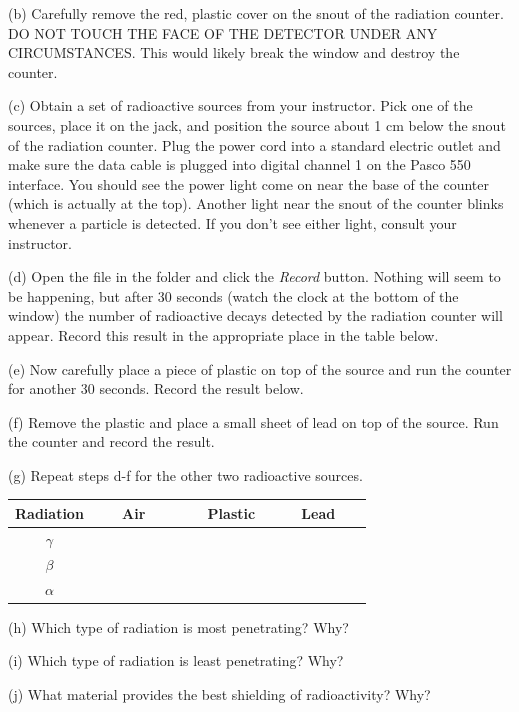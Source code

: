 (b) Carefully remove the red, plastic cover on the snout of the radiation counter.
DO NOT TOUCH THE FACE OF THE DETECTOR UNDER ANY CIRCUMSTANCES. This would likely
break the window and destroy the counter.

(c) Obtain a set of radioactive sources from your instructor.
Pick one of the sources, place it on the jack, and position the source about 1 cm below
the snout of the radiation counter.
Plug the power cord into a standard electric outlet and make sure the data cable is plugged
into digital channel 1 on the Pasco 550 interface.
You should see the power light come on near the base of the counter (which is actually at the
top).
Another light near the snout of the counter blinks whenever a particle
is detected.
If you don't see either light, consult your instructor.

(d) Open the  file in the \filename{\coursefolder} folder and click
the \textit{Record} button.
Nothing will seem to be happening, but after 30 seconds (watch the clock at the bottom
of the window) the number of radioactive decays detected by the 
radiation counter will appear.
Record this result in the appropriate place in the table below.

(e) Now carefully place a piece of plastic on top of the source and run the
counter for another 30 seconds. Record the result below.

(f) Remove the plastic and place a small sheet of lead on top of the source.
Run the counter and record the result.

(g) Repeat steps d-f for the other two radioactive sources.


\vspace{0.3cm}
{\centering \begin{tabular}{|c|c|c|c|}
\hline 
Radiation&
~~~Air~~~~&
~~Plastic~&
~~~Lead~~~\\
\hline
\hline 
\( \gamma \)&
&
&
\\
\hline 
\( \beta \)&
&
&
\\
\hline 
\( \alpha \)&
&
&
\\
\hline
\end{tabular}\par}
\answerspace{0.3cm}

(h) Which type of radiation is most penetrating? Why?
\answerspace{15mm}

(i) Which type of radiation is least penetrating? Why?
\answerspace{15mm}

(j) What material provides the best shielding of radioactivity? Why?
\answerspace{15mm}

